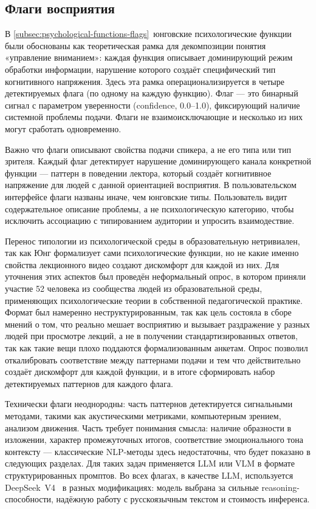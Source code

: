 \subsection{Флаги восприятия}
\label{sec:method-flags}

В \cref{subsec:psychological-functions-flags}~юнговские психологические функции
были обоснованы как теоретическая рамка для декомпозиции понятия
«управление вниманием»: каждая функция описывает доминирующий режим обработки
информации, нарушение которого создаёт специфический тип когнитивного напряжения.
Здесь эта рамка операционализируется в четыре детектируемых флага (по одному на каждую функцию).
Флаг — это бинарный сигнал с параметром уверенности (confidence, 0.0–1.0),
фиксирующий наличие системной проблемы подачи.
Флаги не взаимоисключающие и несколько из них могут сработать одновременно.

Важно что флаги описывают свойства подачи спикера, а не его типа или тип зрителя.
Каждый флаг детектирует нарушение доминирующего канала конкретной функции —
паттерн в поведении лектора, который создаёт когнитивное напряжение 
для людей с данной ориентацией восприятия.
В пользовательском интерфейсе флаги названы иначе, чем юнговские типы.
Пользователь видит содержательное описание проблемы,
а не психологическую категорию, 
чтобы исключить ассоциацию с типированием аудитории и упросить взаимодествие.

Перенос типологии из психологической среды в образовательную нетривиален, так как 
Юнг формализует сами психологические функции, но не
какие именно свойства лекционного видео создают дискомфорт для каждой из них.
Для уточнения этих аспектов был проведён неформальный опрос, в котором приняли
участие 52 человека из сообщества людей из образовательной среды,
применяющих психологические теории в собственной педагогической практике.
Формат был намеренно неструктурированным, так как цель состояла в сборе мнений
о том, что реально мешает восприятию и вызывает раздражение у разных людей при просмотре лекций,
а не в получении стандартизированных ответов, так как такие вещи плохо
поддаются формализованным анкетам.
Опрос позволил откалибровать соответствие между паттернами подачи
и тем что действительно создаёт дискомфорт для каждой функции,
и в итоге сформировать набор детектируемых паттернов для каждого флага.

Технически флаги неоднородны: часть паттернов детектируется сигнальными
методами, такими как акустическими метриками, компьютерным зрением, анализом движения.
Часть требует понимания смысла: наличие образности в изложении,
характер промежуточных итогов, соответствие эмоционального тона контексту —
классические NLP-методы здесь недостаточны, что будет показано в следующих разделах.
Для таких задач применяется LLM или VLM в формате структурированных промптов.
Во всех флагах, в качестве LLM, используется DeepSeek~V4~\cite{deepseekai2026deepseekv4} в разных модификациях:
модель выбрана за сильные reasoning-способности, надёжную работу
с русскоязычным текстом и стоимость инференса.

